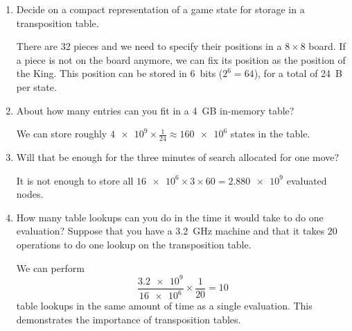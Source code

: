 \documentclass[11pt, a4paper]{article}
\begin{document}
\begin{enumerate}
    \item Decide on a compact representation of a game state for storage in a transposition table.

    \begin{solution}
        There are 32 pieces and we need to specify their positions in a $8 \times 8$ board. If a piece is not on the board anymore, we can fix its position as the position of the King. This position can be stored in \qty{6}{bits} ($2^6 = 64$), for a total of \qty{24}{B} per state.
    \end{solution}

    \item About how many entries can you fit in a \qty{4}{\giga B} in-memory table?

    \begin{solution}
        We can store roughly $\num{4e9} \times \frac{1}{24} \approx \num{160e6}$ states in the table.
    \end{solution}

    \item Will that be enough for the three minutes of search allocated for one move?

    \begin{solution}
        It is not enough to store all $\num{16e6} \times 3 \times 60 = \num{2.880e9}$ evaluated nodes.
    \end{solution}

    \item How many table lookups can you do in the time it would take to do one evaluation? Suppose that you have a \qty{3.2}{\giga\hertz} machine and that it takes 20 operations to do one lookup on the transposition table.

    \begin{solution}
        We can perform
        \begin{equation*}
            \frac{\num{3.2e9}}{\num{16e6}} \times \frac{1}{20} = 10
        \end{equation*}
        table lookups in the same amount of time as a single evaluation. This demonstrates the importance of transposition tables.
    \end{solution}
\end{enumerate}

\newpage 

\startquiz
\end{document}
